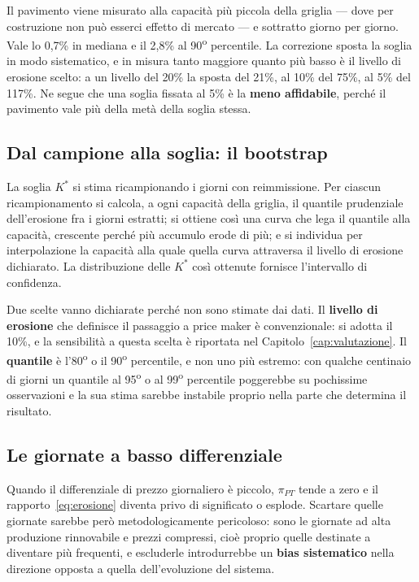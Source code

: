 Il pavimento viene misurato alla capacit\`a pi\`u piccola della griglia — dove per costruzione
non pu\`o esserci effetto di mercato — e sottratto giorno per giorno. Vale lo 0{,}7\% in
mediana e il 2{,}8\% al 90\textsuperscript{o} percentile. La correzione sposta la soglia in
modo sistematico, e in misura tanto maggiore quanto pi\`u basso \`e il livello di erosione
scelto: a un livello del 20\% la sposta del 21\%, al 10\% del 75\%, al 5\% del 117\%. Ne segue
che una soglia fissata al 5\% \`e la \textbf{meno affidabile}, perch\'e il pavimento vale pi\`u
della met\`a della soglia stessa.

\subsection{Dal campione alla soglia: il bootstrap}
\label{sec:bootstrap}

La soglia $K^*$ si stima ricampionando i giorni con reimmissione. Per ciascun
ricampionamento si calcola, a ogni capacit\`a della griglia, il quantile prudenziale
dell'erosione fra i giorni estratti; si ottiene cos\`i una curva che lega il quantile alla
capacit\`a, crescente perch\'e pi\`u accumulo erode di pi\`u; e si individua per interpolazione
la capacit\`a alla quale quella curva attraversa il livello di erosione dichiarato. La
distribuzione delle $K^*$ cos\`i ottenute fornisce l'intervallo di confidenza.

Due scelte vanno dichiarate perch\'e non sono stimate dai dati. Il \textbf{livello di
erosione} che definisce il passaggio a price maker \`e convenzionale: si adotta il 10\%, e la
sensibilit\`a a questa scelta \`e riportata nel Capitolo~\ref{cap:valutazione}. Il
\textbf{quantile} \`e l'80\textsuperscript{o} o il 90\textsuperscript{o} percentile, e non uno
pi\`u estremo: con qualche centinaio di giorni un quantile al 95\textsuperscript{o} o al
99\textsuperscript{o} percentile poggerebbe su pochissime osservazioni e la sua stima sarebbe
instabile proprio nella parte che determina il risultato.

\subsection{Le giornate a basso differenziale}
\label{sec:basso-spread}

Quando il differenziale di prezzo giornaliero \`e piccolo, $\pi_{PT}$ tende a zero e il
rapporto~\eqref{eq:erosione} diventa privo di significato o esplode. Scartare quelle giornate
sarebbe per\`o metodologicamente pericoloso: sono le giornate ad alta produzione rinnovabile
e prezzi compressi, cio\`e proprio quelle destinate a diventare pi\`u frequenti, e escluderle
introdurrebbe un \textbf{bias sistematico} nella direzione opposta a quella dell'evoluzione
del sistema.

